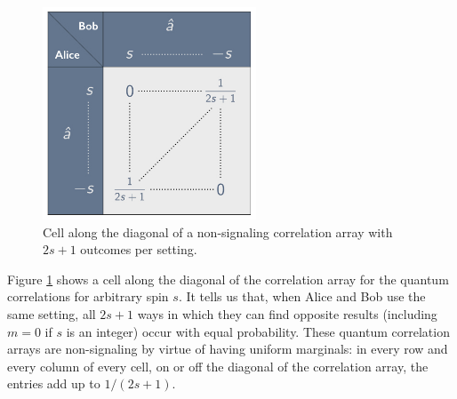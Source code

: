 \begin{figure}[h]
 \centering
   \includegraphics[width=2.5in]{diag-cell-sxs.jpeg} 
   \caption{Cell along the diagonal of a non-signaling correlation array with $2s+1$ outcomes per setting.}
   \label{diag-cell-sxs}
\end{figure}

Figure \ref{diag-cell-sxs} shows a cell along the diagonal of the correlation array for the quantum correlations for arbitrary spin $s$. It tells us that, when Alice and Bob use the same setting, all $2s \! + \! 1$ ways in which they can find opposite results (including $m = 0$ if $s$ is an integer) occur with equal probability. These quantum correlation arrays are non-signaling by virtue of having uniform marginals: in every row and every column of every cell, on or off the diagonal of the correlation array, the entries add up to $1/(2s \! + \! 1)$. 

